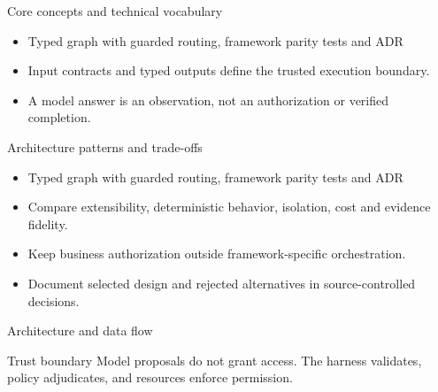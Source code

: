 \documentclass[aspectratio=169,10pt]{beamer}
\begin{document}
\begin{frame}{Core concepts and technical vocabulary}
\small
\begin{itemize}
\item Typed graph with guarded routing, framework parity tests and ADR
\item Input contracts and typed outputs define the trusted execution boundary.
\item A model answer is an observation, not an authorization or verified completion.
\end{itemize}

\end{frame}

\begin{frame}{Architecture patterns and trade-offs}
\small
\begin{itemize}
\item Typed graph with guarded routing, framework parity tests and ADR
\item Compare extensibility, deterministic behavior, isolation, cost and evidence fidelity.
\item Keep business authorization outside framework-specific orchestration.
\item Document selected design and rejected alternatives in source-controlled decisions.
\end{itemize}

\end{frame}

\begin{frame}{Architecture and data flow}
\small
\centering
{}
\vspace{0.6cm}
\begin{block}{Trust boundary}
Model proposals do not grant access. The harness validates, policy adjudicates, and resources enforce permission.
\end{block}
\end{frame}
\end{document}
